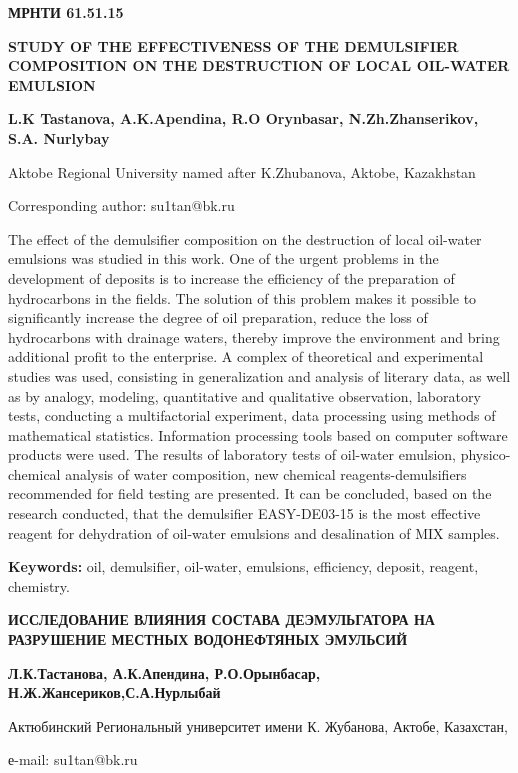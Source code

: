 \newpage
{\bfseries МРНТИ 61.51.15}

{\bfseries STUDY OF THE EFFECTIVENESS OF THE DEMULSIFIER COMPOSITION ON THE
DESTRUCTION OF LOCAL OIL-WATER EMULSION}

{\bfseries L.K Tastanova, A.K.Apendina, R.O Orynbasar, N.Zh.Zhanserikov,
S.A. Nurlybay}

Aktobe Regional University named after K.Zhubanova, Aktobe, Kazakhstan

Corresponding author: su1tan@bk.ru

The effect of the demulsifier composition on the destruction of local
oil-water emulsions was studied in this work. One of the urgent problems
in the development of deposits is to increase the efficiency of the
preparation of hydrocarbons in the fields. The solution of this problem
makes it possible to significantly increase the degree of oil
preparation, reduce the loss of hydrocarbons with drainage waters,
thereby improve the environment and bring additional profit to the
enterprise. A complex of theoretical and experimental studies was used,
consisting in generalization and analysis of literary data, as well as
by analogy, modeling, quantitative and qualitative observation,
laboratory tests, conducting a multifactorial experiment, data
processing using methods of mathematical statistics. Information
processing tools based on computer software products were used. The
results of laboratory tests of oil-water emulsion, physico-chemical
analysis of water composition, new chemical reagents-demulsifiers
recommended for field testing are presented. It can be concluded, based
on the research conducted, that the demulsifier EASY-DE03-15 is the most
effective reagent for dehydration of oil-water emulsions and
desalination of MIX samples.

{\bfseries Keywords:} oil, demulsifier, oil-water, emulsions, efficiency,
deposit, reagent, chemistry.

{\bfseries ИССЛЕДОВАНИЕ ВЛИЯНИЯ СОСТАВА ДЕЭМУЛЬГАТОРА НА РАЗРУШЕНИЕ МЕСТНЫХ
ВОДОНЕФТЯНЫХ ЭМУЛЬСИЙ}

{\bfseries Л.К.Тастанова, А.К.Апендина, Р.О.Орынбасар,
Н.Ж.Жансериков,С.А.Нурлыбай}

Актюбинский Региональный университет имени К. Жубанова, Актобе,
Казахстан,

е-mail: su1tan@bk.ru

